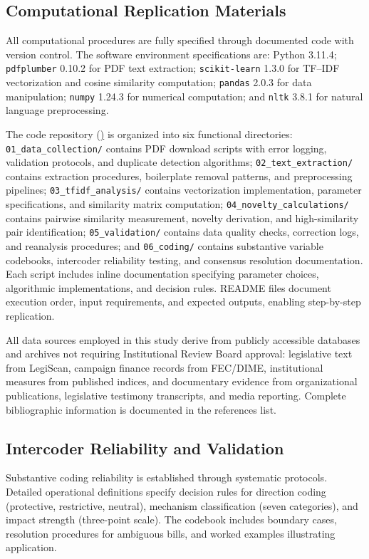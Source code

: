 \documentclass[12pt]{report}
\begin{document}
\subsection{Computational Replication Materials}
All computational procedures are fully specified through documented code with version
control. The software environment specifications are: Python 3.11.4; \texttt{pdfplumber}
0.10.2 for PDF text extraction; \texttt{scikit-learn} 1.3.0 for TF--IDF vectorization
and cosine similarity computation; \texttt{pandas} 2.0.3 for data manipulation;
\texttt{numpy} 1.24.3 for numerical computation; and \texttt{nltk} 3.8.1 for natural
language preprocessing. 

The code repository (\href{https://github.com/lilikowalski19-coder/post-dobbs-diffusion}) is organized into six functional directories: \texttt{01\_data\_collection/} contains PDF download
scripts with error logging, validation protocols, and duplicate detection algorithms;
\texttt{02\_text\_extraction/} contains extraction procedures, boilerplate removal
patterns, and preprocessing pipelines; \texttt{03\_tfidf\_analysis/} contains
vectorization implementation, parameter specifications, and similarity matrix
computation; \texttt{04\_novelty\_calculations/} contains pairwise similarity
measurement, novelty derivation, and high-similarity pair identification;
\texttt{05\_validation/} contains data quality checks, correction logs, and
reanalysis procedures; and \texttt{06\_coding/} contains substantive variable
codebooks, intercoder reliability testing, and consensus resolution documentation.
Each script includes inline documentation specifying parameter choices, algorithmic
implementations, and decision rules. README files document execution order, input
requirements, and expected outputs, enabling step-by-step replication.

All data sources employed in this study derive from publicly accessible databases
and archives not requiring Institutional Review Board approval: legislative text
from LegiScan, campaign finance records from FEC/DIME, institutional measures from
published indices, and documentary evidence from organizational publications,
legislative testimony transcripts, and media reporting. Complete bibliographic
information is documented in the references list.

\subsection{Intercoder Reliability and Validation}
Substantive coding reliability is established through systematic protocols. Detailed
operational definitions specify decision rules for direction coding (protective,
restrictive, neutral), mechanism classification (seven categories), and impact strength
(three-point scale). The codebook includes boundary cases, resolution procedures for
ambiguous bills, and worked examples illustrating application.
\end{document}

